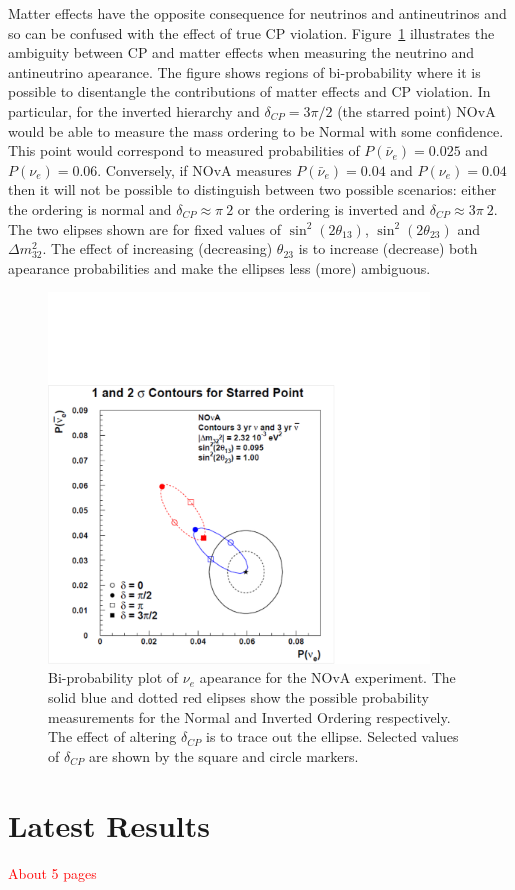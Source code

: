 Matter effects have the opposite consequence for neutrinos and
antineutrinos and so can be confused with the effect of true CP
violation. Figure~\ref{fig:BiProb} illustrates the ambiguity between
CP and matter effects when measuring the neutrino and antineutrino
apearance. 
The figure shows regions of bi-probability where it is possible to
disentangle the contributions of matter effects and CP violation. In
particular, for the inverted hierarchy and $\delta_{CP} = 3\pi /2$
(the starred point) NOvA would be able to measure the mass ordering to 
be Normal with some confidence. This point would correspond to
measured probabilities of $P(\bar{\nu}_e) = 0.025$ and $P(\nu_e) =
0.06$. 
Conversely, if NOvA measures $P(\bar{\nu}_e) = 0.04$ and $P(\nu_e) =
0.04$ then it will not be possible to distinguish between two possible
scenarios: either the ordering is normal and $\delta_{CP} \approx \pi
\ 2$ or the ordering is inverted and $\delta_{CP} \approx 3 \pi
\ 2$.
The two elipses shown are for fixed values of 
$\sin^2\left( 2\theta_{13} \right)$, $\sin^2\left( 2\theta_{23}
\right)$ and $\Delta m_{32}^2$. The effect of increasing (decreasing)
$\theta_{23}$ is to increase (decrease) both apearance probabilities
and make the ellipses less (more) ambiguous.

\begin{figure}
  \centering
  \includegraphics[width=0.9\textwidth]{../../img/Theory/09_Bi-Probability_Plots.pdf}
  \caption{
    Bi-probability plot of $\nu_e$ apearance for the NOvA experiment. 
    The solid blue and dotted red elipses show the possible
    probability measurements for the Normal and Inverted Ordering
    respectively. The effect of altering $\delta_{CP}$ is to trace out the
    ellipse. Selected values of $\delta_{CP}$ are shown by the square
    and circle markers.
  } 
  \label{fig:BiProb}
\end{figure}


\section{Latest Results}
\textcolor{red}{About 5 pages}